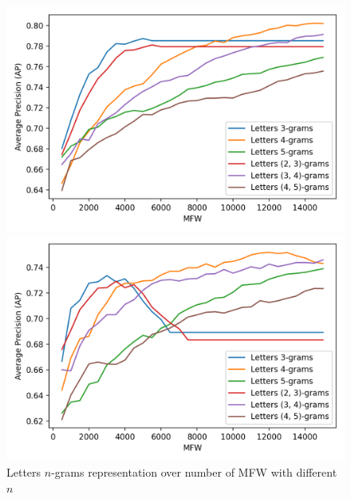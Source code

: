 \begin{figure}
  \caption{Letters $n$-grams representation over number of MFW with different $n$}
  \label{fig:letter_ngrams}

  \label{fig:letter_ngrams_oxquarry}
  \includegraphics[width=\linewidth]{img/letter_ngrams_oxquarry.png}

  \vspace{0.5cm}

  \label{fig:letter_ngrams_brunet}
  \includegraphics[width=\linewidth]{img/letter_ngrams_brunet.png}

  \vspace{0.5cm}


\end{figure}

